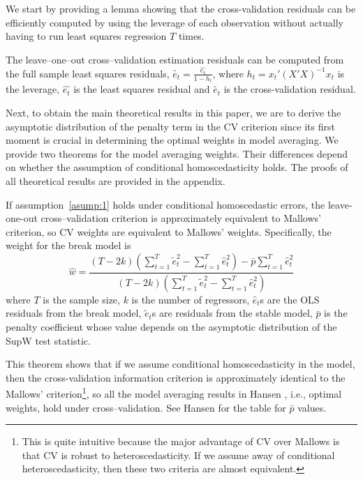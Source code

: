 We start by providing a lemma showing that the cross-validation residuals can be efficiently computed by using the leverage of each observation without actually having to run least squares regression $T$ times.
\begin{lemma} \label{lem:1}
The leave--one--out cross--validation estimation residuals can be computed from the full sample least squares residuals, $\tilde{e_t} = \frac{\hat{e_t}}{1-h_t}$, where $h_t = x_t' (X'X)^{-1} x_t$ is the leverage, $\hat{e_t}$ is the least squares residual and $\tilde{e_t}$ is the cross-validation residual.
\end{lemma}

Next, to obtain the main theoretical results in this paper, we are to derive the asymptotic distribution of the penalty term in the CV criterion since its first moment is crucial in determining the optimal weights in model averaging. We provide two theorems for the model averaging weights. Their differences depend on whether the assumption of conditional homoscedasticity holds. The proofs of all theoretical results are provided in the appendix.
\begin{theorem} \label{thm:1}
If assumption~\ref{asump:1} holds under conditional homoscedastic errors, the leave-one-out cross--validation criterion is approximately equivalent to Mallows' criterion, so CV weights are equivalent to Mallows' weights. Specifically, the weight for the break model is
\begin{equation}
\hat{w} = \frac{(T - 2k)(\sum_{t=1}^{T}\tilde{e}_{t}^{2} - \sum_{t=1}^{T}\hat{e}_{t}^{2}) - \bar{p}\sum_{t=1}^{T}\hat{e}_{t}^{2}}{(T - 2k)(\sum_{t=1}^{T}\tilde{e}_{t}^{2} - \sum_{t=1}^{T}\hat{e}_{t}^{2})}
\end{equation}
where $T$ is the sample size, $k$ is the number of regressors, $\hat{e}_t$s are the OLS residuals from the break model, $\tilde{e}_t$s are residuals from the stable model, $\bar{p}$ is the penalty coefficient whose value depends on the asymptotic distribution of the SupW test statistic.
\end{theorem}
This theorem shows that if we assume conditional homoscedasticity in the model, then the cross-validation information criterion is approximately identical to the Mallows' criterion\footnote{This is quite intuitive because the major advantage of CV over Mallows is that CV is robust to heteroscedasticity. If we assume away of conditional heteroscedasticity, then these two criteria are almost equivalent.}, so all the model averaging results in Hansen \cite{hansen2009averaging}, i.e., optimal weights, hold under cross--validation. See Hansen \cite{hansen2009averaging} for the table for $\bar{p}$ values.

